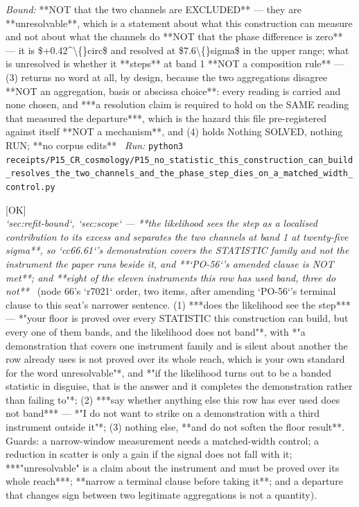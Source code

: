 \begin{description}
 \emph{Bound:}  **NOT that the two channels are EXCLUDED** --- they are **unresolvable**, which is a statement about what this construction can measure and not about what the channels do  **NOT that the phase difference is zero** --- it is \$+0.42\textasciicircum{}\textbackslash\{\}circ\$ and resolved at \$7.6\textbackslash\{\}sigma\$ in the upper range; what is unresolved is whether it **steps** at band 1  **NOT a composition rule** --- (3) returns no word at all, by design, because the two aggregations disagree  **NOT an aggregation, basis or abscissa choice**: every reading is carried and none chosen, and ***a resolution claim is required to hold on the SAME reading that measured the departure***, which is the hazard this file pre-registered against itself  **NOT a mechanism**, and (4) holds  Nothing SOLVED, nothing RUN; **no corpus edits**
\ \emph{Run:} \texttt{python3 receipts/P15\_CR\_cosmology/P15\_no\_statistic\_this\_construction\_can\_build\_resolves\_the\_two\_channels\_and\_the\_phase\_step\_dies\_on\_a\_matched\_width\_control.py}
\item[\rcptlabel{P15_the_likelihood_sees_the_step_and_separates_the_two_channels_so_the_demonstration_does_not_cover_it}{P15R209}\textbf{P15R209}\quad\texttt{P15\_the\_likelihood\_sees\_the\_step\_and\_separates\_the\_two\_channels\_so\_the\_demonstration\_does\_not\_cover\_it}]\hfill\textsf{[OK]}\\
\textit{`sec:refit-bound`, `sec:scope` --- **the likelihood sees the step as a localised contribution to its excess and separates the two channels at band 1 at twenty-five sigma**, so `cc66.61`'s demonstration covers the STATISTIC family and not the instrument the paper runs beside it, and **`PO-56`'s amended clause is NOT met**; and **eight of the eleven instruments this row has used band, three do not**} \ (node 66's `r7021` order, two items, after amending `PO-56`'s terminal clause to this seat's narrower sentence. (1) ***does the likelihood see the step*** --- *"your floor is proved over every STATISTIC this construction can build, but every one of them bands, and the likelihood does not band"*, with *"a demonstration that covers one instrument family and is silent about another the row already uses is not proved over its whole reach, which is your own standard for the word unresolvable"*, and *"if the likelihood turns out to be a banded statistic in disguise, that is the answer and it completes the demonstration rather than failing to"*; (2) ***say whether anything else this row has ever used does not band*** --- *"I do not want to strike on a demonstration with a third instrument outside it"*; (3) nothing else, **and do not soften the floor result**.  Guards: a narrow-window measurement needs a matched-width control; a reduction in scatter is only a gain if the signal does not fall with it; ***"unresolvable" is a claim about the instrument and must be proved over its whole reach***; **narrow a terminal clause before taking it**; and a departure that changes sign between two legitimate aggregations is not a quantity). 

\end{description}
